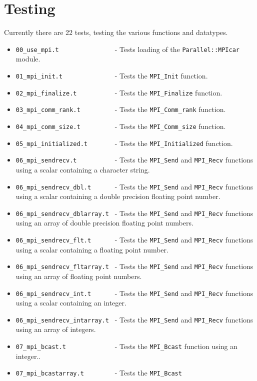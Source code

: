 \documentclass{report}
\begin{document}
\section*{Testing}
	Currently there are 22 tests, testing the various functions
and datatypes.
\begin{itemize}
	\item \verb|00_use_mpi.t               | - Tests loading of the
\verb|Parallel::MPIcar| module.
	\item \verb|01_mpi_init.t              | - Tests the \verb|MPI_Init|
function.
	\item \verb|02_mpi_finalize.t          | - Tests the
\verb|MPI_Finalize| function.
	\item \verb|03_mpi_comm_rank.t         | - Tests the
\verb|MPI_Comm_rank| function.
	\item \verb|04_mpi_comm_size.t         | - Tests the
\verb|MPI_Comm_size| function.
	\item \verb|05_mpi_initialized.t       | - Tests the
\verb|MPI_Initialized| function.
	\item \verb|06_mpi_sendrecv.t          | - Tests the
\verb|MPI_Send| and \verb|MPI_Recv| functions using a scalar
containing a character string.
	\item \verb|06_mpi_sendrecv_dbl.t      | - Tests the
\verb|MPI_Send| and \verb|MPI_Recv| functions using a scalar
containing a double precision floating point number.
	\item \verb|06_mpi_sendrecv_dblarray.t | - Tests the
\verb|MPI_Send| and \verb|MPI_Recv| functions using an array of double
precision floating point numbers.
	\item \verb|06_mpi_sendrecv_flt.t      | - Tests the
\verb|MPI_Send| and \verb|MPI_Recv| functions using a scalar
containing a floating point number.
	\item \verb|06_mpi_sendrecv_fltarray.t | - Tests the
\verb|MPI_Send| and \verb|MPI_Recv| functions using an array of
floating point numbers.
	\item \verb|06_mpi_sendrecv_int.t      | - Tests the
\verb|MPI_Send| and \verb|MPI_Recv| functions using a scalar
containing an integer.
	\item \verb|06_mpi_sendrecv_intarray.t | - Tests the
\verb|MPI_Send| and \verb|MPI_Recv| functions using an array of
integers.
	\item \verb|07_mpi_bcast.t             | - Tests the \verb|MPI_Bcast|
function using an integer..
	\item \verb|07_mpi_bcastarray.t        | - Tests the \verb|MPI_Bcast|

\end{itemize}
\end{document}
